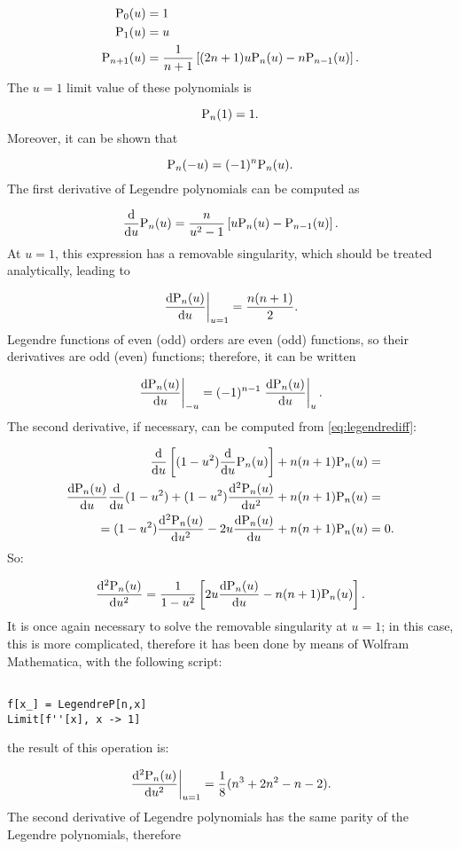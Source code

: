 \documentclass[a4paper,12pt]{article}
\begin{document}
\begin{align*}
\mathrm{P}_0(u) &= 1 \\
\mathrm{P}_1(u) &= u \\
\mathrm{P}_{n+1}(u) &= \frac{1}{n+1} \left[ (2 n + 1) u \mathrm{P}_n(u) - n \mathrm{P}_{n-1}(u) \right].
\end{align*}
The $u=1$ limit value of these polynomials is 

\[
\mathrm{P}_n(1) = 1.
\]
Moreover, it can be shown that

\[
\mathrm{P}_n(-u) = (-1)^n \mathrm{P}_n(u).
\]
The first derivative of Legendre polynomials can be computed as

\[
\frac{\mathrm{d}}{\mathrm{d} u} \mathrm{P}_n(u) = \frac{n}{u^2 - 1} \left[ u \mathrm{P}_n(u) - \mathrm{P}_{n-1}(u) \right].
\]
At $u=1$, this expression has a removable singularity, which should be treated analytically, leading to

\[
\left. \frac{\mathrm{d} \mathrm{P}_n(u)}{\mathrm{d} u} \right|_{u=1} = \frac{n(n+1)}{2}.
\]
Legendre functions of even (odd) orders are even (odd) functions, so their derivatives are odd (even) functions; therefore, it can be written

\[
\left. \frac{\mathrm{d} \mathrm{P}_n(u)}{\mathrm{d} u} \right|_{-u} = (-1)^{n-1} \left. \frac{\mathrm{d} \mathrm{P}_n(u)}{\mathrm{d} u} \right|_{u}.
\]
The second derivative, if necessary, can be computed from \eqref{eq:legendrediff}:

\begin{align*}
\frac{\mathrm{d}}{\mathrm{d} u} \left[ (1-u^2) \frac{\mathrm{d}}{\mathrm{d} u} \mathrm{P}_n(u) \right] + n(n+1) \mathrm{P}_n(u) &= \\
\frac{\mathrm{d} \mathrm{P}_n(u)}{\mathrm{d} u} \frac{\mathrm{d}}{\mathrm{d} u} ( 1 - u^2 ) + (1-u^2) \frac{\mathrm{d}^2 \mathrm{P}_n(u)}{\mathrm{d} u^2} + n (n+1) \mathrm{P}_n(u) &= \\
= (1 - u^2) \frac{\mathrm{d}^2 \mathrm{P}_n(u)}{\mathrm{d} u^2} - 2 u \frac{\mathrm{d} \mathrm{P}_n(u)}{\mathrm{d} u} + n(n+1) \mathrm{P}_n(u) &= 0.
\end{align*}
So:

\[
\frac{\mathrm{d}^2 \mathrm{P}_n(u)}{\mathrm{d} u^2} = \frac{1}{1 - u^2} \left[ 2 u \frac{\mathrm{d} \mathrm{P}_n(u)}{\mathrm{d} u} - n(n+1) \mathrm{P}_n(u) \right].
\]
It is once again necessary to solve the removable singularity at $u=1$; in this case, this is more complicated, therefore it has been done by means of Wolfram Mathematica, with the following script:

\begin{verbatim}

f[x_] = LegendreP[n,x]
Limit[f''[x], x -> 1]

\end{verbatim}
the result of this operation is:

\[
\left. \frac{\mathrm{d}^2 \mathrm{P}_n(u)}{\mathrm{d} u^2} \right|_{u=1} = \frac{1}{8} (n^3 + 2 n^2 - n - 2).
\]
The second derivative of Legendre polynomials has the same parity of the Legendre polynomials, therefore
\end{document}
